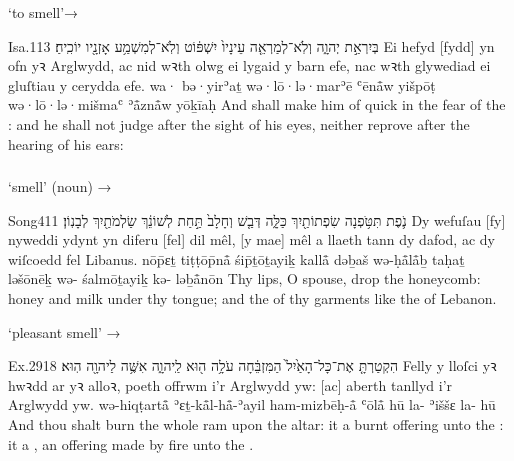 \begin{frame}{ ‘to smell’→ }
	\begin{example}{Isa.}{11}{3}{}{}
		\quoling
		{ בְּיִרְאַ֣ת יְהוָ֑ה וְלֹֽא־לְמַרְאֵ֤ה עֵינָיו֙ יִשְׁפּ֔וֹט וְלֹֽא־לְמִשְׁמַ֥ע אָזְנָ֖יו יוֹכִֽיחַ׃}
		{Ei  hefyd [fydd] yn ofn yꝛ Arglwydd, ac nid wꝛth olwg ei lygaid y barn efe, nac wꝛth glywediad ei gluſtiau y cerydda efe.}
		{wa· bə·yirʾaṯ {\YHWH} wə·lō·lə·marʾē ʿēnå̄w yišpōṭ wə·lō·lə·mišmaʿ ʾå̄znå̄w yōḵīaḥ}
		{And shall make him of quick  in the fear of the {\LORD}: and he shall not judge after the sight of his eyes, neither reprove after the hearing of his ears:}
	\end{example}
\end{frame}



\subsubsection{}

\begin{frame}{ ‘smell’ (noun) → }
	\begin{example}{Song}{4}{11}{}{}
		\quoling
		{נֹ֛פֶת תִּטֹּ֥פְנָה שִׂפְתוֹתַ֖יִךְ כַּלָּ֑ה דְּבַ֤שׁ וְחָלָב֙ תַּ֣חַת לְשׁוֹנֵ֔ךְ  שַׂלְמֹתַ֖יִךְ  לְבָנֽוֹן׃}
		{Dy wefuſau [fy] nyweddi ydynt yn diferu [fel] dil mêl, [y mae] mêl a llaeth tann dy dafod, ac  dy wiſcoedd fel  Libanus.}
		{nōp̄ɛṯ tiṭṭōp̄nå̄ śip̄ṯōṯayiḵ kallå̄ dəḇaš wə-ḥå̄lå̄ḇ taḥaṯ ləšōnēḵ wə- śalmōṯayiḵ kə- ləḇå̄nōn}
		{Thy lips, O  spouse, drop  the honeycomb: honey and milk  under thy tongue; and the  of thy garments  like the  of Lebanon.}
	\end{example}
\end{frame}

\begin{frame}{ ‘pleasant smell’ → }
	\begin{example}{Ex.}{29}{18}{}{}
		\quoling
		{הִקְטַרְתָּ֤ אֶת־כָּל־הָאַ֙יִל֙ הַמִּזְבֵּ֔חָה עֹלָ֥ה ה֖וּא לַֽיהוָ֑ה  אִשֶּׁ֥ה לַיהוָ֖ה הֽוּא׃}
		{Felly y lloſci yꝛ hwꝛdd ar yꝛ alloꝛ, poeth offrwm i’r Arglwydd yw:  aberth tanllyd i’r Arglwydd yw.}
		{wə-hiqṭartå̄ ʾɛṯ-kå̄l-hå̄-ʾayil ham-mizbēḥ-å̄ ʿōlå̄ hū la-{\YHWH}  ʾiššɛ la-{\YHWH} hū}
		{And thou shalt burn the whole ram upon the altar: it  a burnt offering unto the {\LORD}: it  a , an offering made by fire unto the {\LORD}.}
	\end{example}
\end{frame}
